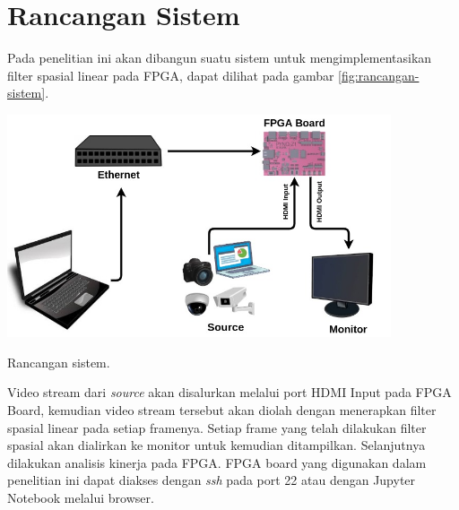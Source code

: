\section{Rancangan Sistem}
Pada penelitian ini akan dibangun suatu sistem untuk mengimplementasikan filter spasial linear pada FPGA, dapat dilihat pada gambar \ref{fig:rancangan-sistem}.
\begin{afigure}
    \includegraphics[width=0.85\textwidth, center]{images/rancangan-sistem.jpg}
    \caption{Rancangan sistem.}
    \label{fig:rancangan-sistem}
\end{afigure}

Video stream dari \textit{source} akan disalurkan melalui port HDMI Input pada FPGA Board, kemudian video stream tersebut akan diolah dengan menerapkan filter spasial linear pada setiap framenya. Setiap frame yang telah dilakukan filter spasial akan dialirkan ke monitor untuk kemudian ditampilkan. Selanjutnya dilakukan analisis kinerja pada FPGA. FPGA board yang digunakan dalam penelitian ini dapat diakses dengan \textit{ssh} pada port 22 atau dengan Jupyter Notebook melalui browser.

